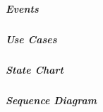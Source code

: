 \subparagraph*{Events}

\subparagraph*{Use Cases}

\subparagraph*{State Chart}

\subparagraph*{Sequence Diagram}
